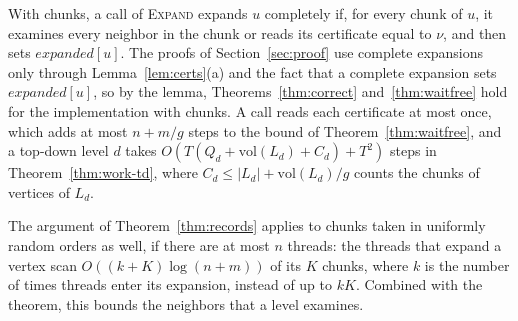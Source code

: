 With chunks, a call of \textsc{Expand} expands $u$ completely if, for every chunk of $u$, it examines every neighbor in the chunk or reads its certificate equal to $\nu$, and then sets $\mathit{expanded}[u]$. The proofs of Section~\ref{sec:proof} use complete expansions only through Lemma~\ref{lem:certs}(a) and the fact that a complete expansion sets $\mathit{expanded}[u]$, so by the lemma, Theorems~\ref{thm:correct} and~\ref{thm:waitfree} hold for the implementation with chunks. A call reads each certificate at most once, which adds at most $n + m/g$ steps to the bound of Theorem~\ref{thm:waitfree}, and a top-down level $d$ takes $O(T(Q_d + \mathrm{vol}(L_d) + C_d) + T^2)$ steps in Theorem~\ref{thm:work-td}, where $C_d \leq |L_d| + \mathrm{vol}(L_d)/g$ counts the chunks of vertices of $L_d$.

The argument of Theorem~\ref{thm:records} applies to chunks taken in uniformly random orders as well, if there are at most $n$ threads: the threads that expand a vertex scan $O((k + K)\log(n+m))$ of its $K$ chunks, where $k$ is the number of times threads enter its expansion, instead of up to $kK$. Combined with the theorem, this bounds the neighbors that a level examines.

